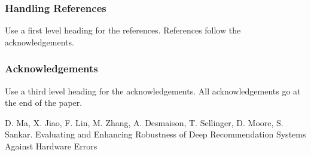 \documentclass[a4paper]{article}
\begin{document}
\subsubsection{Handling References}

Use a first level heading for the references. References follow the
acknowledgements.


\subsubsection{Acknowledgements}

Use a third level heading for the acknowledgements. All acknowledgements
go at the end of the paper.




% 
%

\begin{thebibliography}{Com79}
 D. Ma, X. Jiao, F. Lin, M. Zhang, A. Desmaison, T. Sellinger, D. Moore, S. Sankar.
\newblock Evaluating and Enhancing Robustness of Deep Recommendation Systems Against Hardware Errors

\end{thebibliography}
\end{document}
